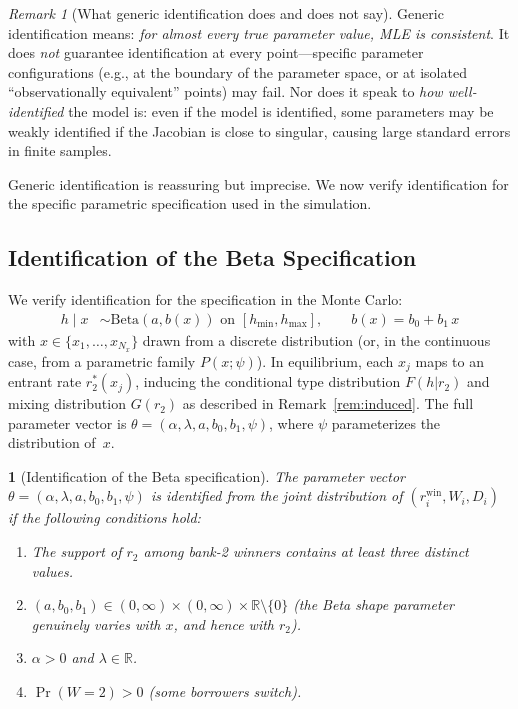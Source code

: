 \documentclass[12pt]{article}
\theoremstyle{plain}
\theoremstyle{plain}
\newtheorem{prop}[thm]{\protect\propositionname}
\theoremstyle{definition}  %
\theoremstyle{remark}  %
\newtheorem{remark}[thm]{Remark}  %
\providecommand{\propositionname}{Proposition}
\begin{document}
\begin{remark}[What generic identification does and does not say]\label{rem:generic}
Generic identification means: \emph{for almost every true parameter value, MLE is consistent}.  It does \emph{not} guarantee identification at every point---specific parameter configurations (e.g., at the boundary of the parameter space, or at isolated ``observationally equivalent'' points) may fail.  Nor does it speak to \emph{how well-identified} the model is: even if the model is identified, some parameters may be weakly identified if the Jacobian is close to singular, causing large standard errors in finite samples.
\end{remark}

\medskip\noindent
Generic identification is reassuring but imprecise.  We now verify identification for the specific parametric specification used in the simulation.


\subsection{Identification of the Beta Specification}\label{sec:beta_id}

We verify identification for the specification in the Monte Carlo:
\begin{align*}
    h \mid x &\sim \text{Beta}(a, b(x)) \text{ on } [h_{\min}, h_{\max}], \qquad b(x) = b_0 + b_1\, x
\end{align*}
with $x \in \{x_1, \ldots, x_{N_x}\}$ drawn from a discrete distribution (or, in the continuous case, from a parametric family $P(x; \psi)$).  In equilibrium, each $x_j$ maps to an entrant rate $r_2^*(x_j)$, inducing the conditional type distribution $F(h|r_2)$ and mixing distribution $G(r_2)$ as described in Remark~\ref{rem:induced}.  The full parameter vector is $\theta = (\alpha, \lambda, a, b_0, b_1, \psi)$, where $\psi$ parameterizes the distribution of~$x$.

\begin{prop}[Identification of the Beta specification]\label{prop:beta_id}
The parameter vector $\theta = (\alpha, \lambda, a, b_0, b_1, \psi)$ is identified from the joint distribution of $(r_i^{\text{win}}, W_i, D_i)$ if the following conditions hold:
\begin{enumerate}
    \item[(C1)] The support of $r_2$ among bank-2 winners contains at least three distinct values.
    \item[(C2)] $(a, b_0, b_1) \in (0,\infty) \times (0,\infty) \times \mathbb{R} \setminus \{0\}$ (the Beta shape parameter genuinely varies with $x$, and hence with $r_2$).
    \item[(C3)] $\alpha > 0$ and $\lambda \in \mathbb{R}$.
    \item[(C4)] $\Pr(W\!=\!2) > 0$ (some borrowers switch).
\end{enumerate}
\end{prop}
\end{document}
